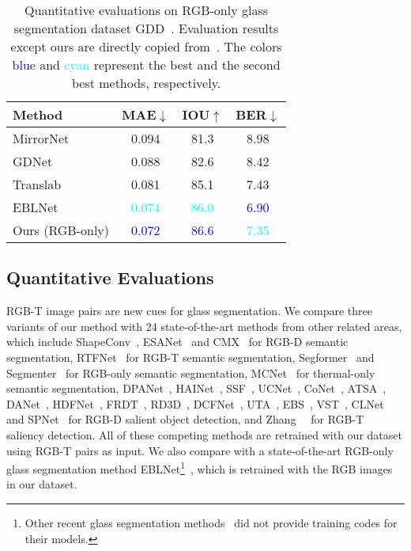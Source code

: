 \begin{table}[t]
\renewcommand\arraystretch{1.5}
\setlength\tabcolsep{5pt}
\centering
\caption{Quantitative evaluations on RGB-only glass segmentation dataset GDD~\cite{mei2020don}. Evaluation results except ours are directly copied from~\cite{He_2021_ICCV}. The colors \textcolor{blue}{blue} and \textcolor{cyan}{cyan} represent the best and the second best methods, respectively.}
\label{tab:GDD}
\begin{tabular}{lccc}
\toprule
Method          & MAE$\downarrow$   & IOU$\uparrow$  & BER$\downarrow$  \\ 
\midrule
MirrorNet~\cite{yang2019my}       & 0.094 & 81.3 & 8.98 \\ 
GDNet~\cite{mei2020don}           & 0.088 & 82.6 & 8.42 \\ 
Translab~\cite{xie2020segmenting}        & 0.081 & 85.1 & 7.43 \\ 
EBLNet~\cite{He_2021_ICCV}          & \textcolor{cyan}{0.074} & \textcolor{cyan}{86.0} & \textcolor{blue}{6.90} \\ \hline
Ours (RGB-only) & \textcolor{blue}{0.072} & \textcolor{blue}{86.6} & \textcolor{cyan}{7.35} \\ 
\bottomrule
\end{tabular}
\end{table}


\subsection{Quantitative Evaluations}
\label{sec:quan}
RGB-T image pairs are new cues for glass segmentation. We compare three variants of our method with 24 state-of-the-art methods from other related areas, which include ShapeConv~\cite{cao2021shapeconv}, ESANet~\cite{seichter2021efficient} and CMX~\cite{liu2022cmx} for RGB-D semantic segmentation, RTFNet~\cite{sun2019rtfnet} for RGB-T semantic segmentation, Segformer~\cite{xie2021segformer} and Segmenter~\cite{strudel2021segmenter} for RGB-only semantic segmentation, MCNet~\cite{xiong2021mcnet} for thermal-only semantic segmentation, DPANet~\cite{chen2020dpanet}, HAINet~\cite{li2021hierarchical}, SSF~\cite{zhang2020select}, UCNet~\cite{zhang2020uc}, CoNet~\cite{ji2020accurate}, ATSA~\cite{zhang2020asymmetric}, DANet~\cite{zhao2020single}, HDFNet~\cite{pang2020hierarchical}, FRDT~\cite{zhang2020feature}, RD3D~\cite{chen2021rgb}, DCFNet~\cite{ji2021calibrated}, UTA~\cite{zhao2021rgb}, EBS~\cite{zhang2021learning}, VST~\cite{liu2021visual}, CLNet~\cite{zhang2021rgb} and SPNet~\cite{zhou2021specificity} for RGB-D salient object detection, and Zhang~\etal~\cite{zhang2020revisiting} for RGB-T saliency detection. All of these competing methods are retrained with our dataset using RGB-T pairs as input. We also compare with a state-of-the-art RGB-only glass segmentation method EBLNet\footnote{Other recent glass segmentation methods~\cite{yang2019my, mei2020don,lin2021rich} did not provide training codes for their models.}~\cite{He_2021_ICCV}, which is retrained with the RGB images in our dataset. 


